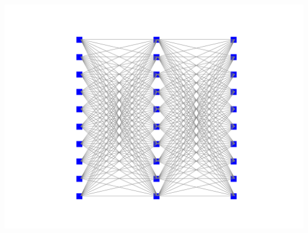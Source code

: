 \begin{center}
	\includegraphics*[width=1\linewidth]{pics/img9.pdf}
	\label{پیکربندی سوال ۶}
\end{center}




